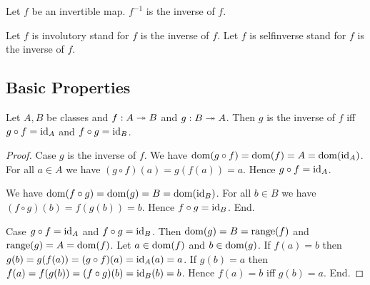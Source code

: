 \documentclass[10pt]{article}
\begin{document}
  \begin{forthel}
    \begin{definition}
      Let $f$ be an invertible map.
      $f^{-1}$ is the inverse of $f$.
    \end{definition}

    Let $f$ is involutory stand for $f$ is the inverse of $f$.
    Let $f$ is selfinverse stand for $f$ is the inverse of $f$.
  \end{forthel}


  \subsection*{Basic Properties}

  \begin{forthel}
    \begin{proposition}
      Let $A, B$ be classes and $f : A \twoheadrightarrow B$ and $g : B \twoheadrightarrow A$.
      Then $g$ is the inverse of $f$ iff $g \circ f = \textrm{id}_{A}$ and $f \circ g = \textrm{id}_{B}$.
    \end{proposition}
    \begin{proof}
      Case $g$ is the inverse of $f$.
        We have
        $\operatorname{dom}(g \circ f)
          = \operatorname{dom}(f)
          = A
          = \operatorname{dom}(\textrm{id}_{A})$.
        For all $a \in A$ we have
        $(g \circ f)(a)
          = g(f(a))
          = a$.
        Hence $g \circ f = \textrm{id}_{A}$.

        We have
        $\operatorname{dom}(f \circ g)
          = \operatorname{dom}(g)
          = B
          = \operatorname{dom}(\textrm{id}_{B})$.
        For all $b \in B$ we have
        $(f \circ g)(b)
          = f(g(b))
          = b$.
        Hence $f \circ g = \textrm{id}_{B}$.
      End.

      Case $g \circ f = \textrm{id}_{A}$ and $f \circ g = \textrm{id}_{B}$.
        Then $\operatorname{dom}(g)
          = B
          = \textrm{range}(f)$
        and $\textrm{range}(g)
          = A
          = \operatorname{dom}(f)$.
        Let $a \in \operatorname{dom}(f)$ and $b \in \operatorname{dom}(g)$.
        If $f(a) = b$ then
        $g(b)
          = g(f(a))
          = (g \circ f)(a)
          = \textrm{id}_{A}(a)
          = a$.
        If $g(b) = a$ then
        $f(a)
          = f(g(b))
          = (f \circ g)(b)
          = \textrm{id}_{B}(b)
          = b$.
        Hence $f(a) = b$ iff $g(b) = a$.
      End.
    \end{proof}
  \end{forthel}
\end{document}
